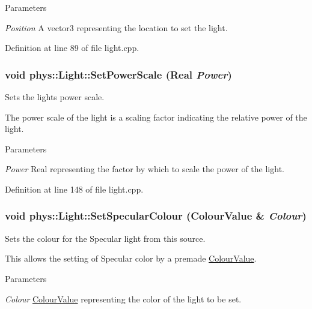 \begin{DoxyParams}{Parameters}
\item[{\em Position}]A vector3 representing the location to set the light. \end{DoxyParams}


Definition at line 89 of file light.cpp.

\hypertarget{classphys_1_1Light_af4a6428b87c443a33261575783a4fb05}{
\subsubsection[{SetPowerScale}]{\setlength{\rightskip}{0pt plus 5cm}void phys::Light::SetPowerScale ({\bf Real} {\em Power})}}
\label{dc/df1/classphys_1_1Light_af4a6428b87c443a33261575783a4fb05}


Sets the lights power scale. 

The power scale of the light is a scaling factor indicating the relative power of the light. 
\begin{DoxyParams}{Parameters}
\item[{\em Power}]Real representing the factor by which to scale the power of the light. \end{DoxyParams}


Definition at line 148 of file light.cpp.

\hypertarget{classphys_1_1Light_a3e3a407c7f4b26a8d2cd44b9013e8716}{
\subsubsection[{SetSpecularColour}]{\setlength{\rightskip}{0pt plus 5cm}void phys::Light::SetSpecularColour ({\bf ColourValue} \& {\em Colour})}}
\label{dc/df1/classphys_1_1Light_a3e3a407c7f4b26a8d2cd44b9013e8716}


Sets the colour for the Specular light from this source. 

This allows the setting of Specular color by a premade \hyperlink{classphys_1_1ColourValue}{ColourValue}. 
\begin{DoxyParams}{Parameters}
\item[{\em Colour}]\hyperlink{classphys_1_1ColourValue}{ColourValue} representing the color of the light to be set. \end{DoxyParams}


